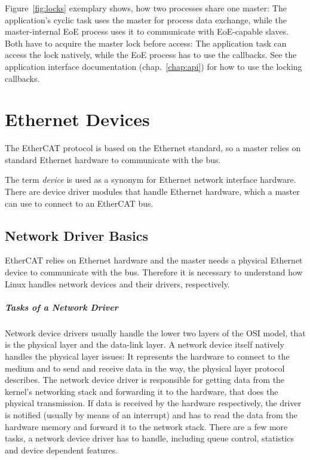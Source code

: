 \documentclass[a4paper,12pt,BCOR6mm,bibtotoc,idxtotoc]{scrbook}
\begin{document}
Figure~\ref{fig:locks} exemplary shows, how two processes share one master:
The application's cyclic task uses the master for process data exchange, while
the master-internal EoE process uses it to communicate with EoE-capable
slaves.  Both have to acquire the master lock before access: The application
task can access the lock natively, while the EoE process has to use the
callbacks. See the application interface documentation (chap.~\ref{chap:api})
for how to use the locking callbacks.


\chapter{Ethernet Devices}
\label{sec:devices}

The EtherCAT protocol is based on the Ethernet standard, so a master relies on
standard Ethernet hardware to communicate with the bus.

The term \textit{device} is used as a synonym for Ethernet network interface
hardware. There are device driver modules that handle Ethernet hardware, which
a master can use to connect to an EtherCAT bus.


\section{Network Driver Basics}
\label{sec:networkdrivers}

EtherCAT relies on Ethernet hardware and the master needs a physical
Ethernet device to communicate with the bus. Therefore it is necessary
to understand how Linux handles network devices and their drivers,
respectively.

\paragraph{Tasks of a Network Driver}

Network device drivers usually handle the lower two layers of the OSI model,
that is the physical layer and the data-link layer. A network device itself
natively handles the physical layer issues: It represents the hardware to
connect to the medium and to send and receive data in the way, the physical
layer protocol describes. The network device driver is responsible for getting
data from the kernel's networking stack and forwarding it to the hardware,
that does the physical transmission.  If data is received by the hardware
respectively, the driver is notified (usually by means of an interrupt) and
has to read the data from the hardware memory and forward it to the network
stack. There are a few more tasks, a network device driver has to handle,
including queue control, statistics and device dependent features.
\end{document}
